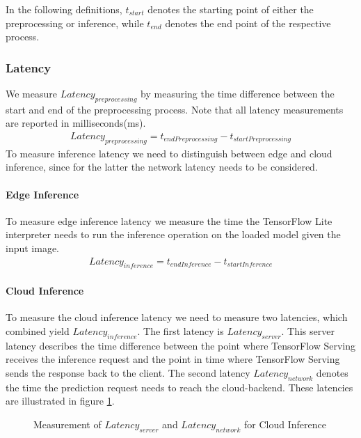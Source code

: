 In the following definitions, $t_{start}$ denotes the starting point of either the preprocessing or inference, while $t_{end}$ denotes the end point of the respective process.
\subsubsection{Latency}
We measure $Latency_{preprocessing}$ by measuring the time difference between the start and end of the preprocessing process.
Note that all latency measurements are reported in milliseconds(ms).
\begin{equation*}
\begin{gathered}
Latency_{preprocessing} = t_{endPreprocessing} - t_{startPreprocessing}
\end{gathered}
\end{equation*}
To measure inference latency we need to distinguish between edge and cloud inference, since for the latter the network latency needs to be considered.

\paragraph{Edge Inference}To measure edge inference latency we measure the time the TensorFlow Lite interpreter needs to run the inference operation on the loaded model given the input image.
\begin{equation*}
\begin{gathered}
Latency_{inference} = t_{endInference} - t_{startInference}
\end{gathered}
\end{equation*}
\paragraph{Cloud Inference}
To measure the cloud inference latency we need to measure two latencies, which combined yield $Latency_{inference}$. The first latency is  $Latency_{server}$. This server latency describes the time difference between the point where TensorFlow Serving receives the inference request and the point in time where TensorFlow Serving sends the response back to the client.
The second latency $Latency_{network}$ denotes the time the prediction request needs to reach the cloud-backend.
These latencies are illustrated in figure \ref{fig:serverLat}.
\begin{figure}[!htb]
\centering

\caption{Measurement of $Latency_{server}$ and $Latency_{network}$ for Cloud Inference}
\label{fig:serverLat}
\end{figure}


